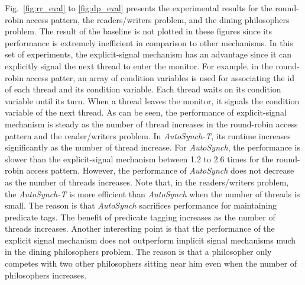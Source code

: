 \documentclass[preprint]{sigplanconf}
\begin{document}
Fig.~\ref{fig:rr_eval} to \ref{fig:dp_eval} presents the experimental results for
the round-robin access pattern, the readers/writers problem, %
and the dining philosophers problem. The result of the
baseline is not plotted in these figures since its performance is extremely
inefficient in comparison to other mechanisms.  In this set of experiments, 
the explicit-signal mechanism has an advantage since it can explicitly signal 
the next thread to enter the monitor. For example, in the round-robin access
patter, an array of condition variables is used for associating the id of each
thread and its condition variable. Each thread waits on its condition variable
until its turn. When a thread leaves the monitor, it signals the condition 
variable of the next thread. As can be seen, the performance of 
explicit-signal mechanism is steady as the number of thread increases in
the round-robin access pattern and the reader/writers problem. In 
{\em AutoSynch-T}, its runtime increases significantly as the 
number of thread increase. For {\em AutoSynch}, the performance is slower than 
the explicit-signal mechanism between 1.2 to 2.6 times for the round-robin access
pattern. However, the performance of {\em AutoSynch} does not decrease as the 
number of threads increases. Note that, in the readers/writers problem, the
{\em AutoSynch-T} is more efficient than {\em AutoSynch} when the number of
threads is small. The reason is that {\em AutoSynch} sacrifices performance for
maintaining predicate tags. The benefit of predicate tagging increases as the
number of threads increases. Another interesting point is that the
performance of the explicit signal mechanism does not outperform implicit
signal mechanisms much in the dining philosophers problem. The reason is that
a philosopher only competes with two other philosophers sitting near him even
when the number of philosophers increases. 
\end{document}
